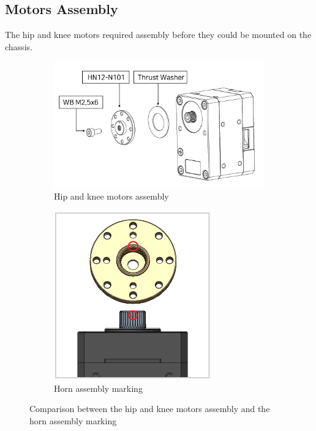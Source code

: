 \subsection{Motors Assembly}
The hip and knee motors required assembly before they could be mounted on the chassis.
\begin{figure}[h]
	\centering
	\begin{subfigure}[t]{0.45\textwidth}
		\centering
		\includegraphics[height=0.7\textwidth]{hip_knee_motors_assembly}
		\caption{Hip and knee motors assembly}
		\label{fig:hipkneemotorsassembly}
	\end{subfigure}
	\begin{subfigure}[t]{0.45\textwidth}
		\centering
		\includegraphics[height=0.7\textwidth]{horn_assembly_marking}
		\caption{Horn assembly marking}
		\label{fig:horn_assembly_marking}
	\end{subfigure}
	\caption{Comparison between the hip and knee motors assembly and the horn assembly marking}
	\label{fig:Comparison between the hip and knee motors assembly and the horn assembly marking}
\end{figure}

